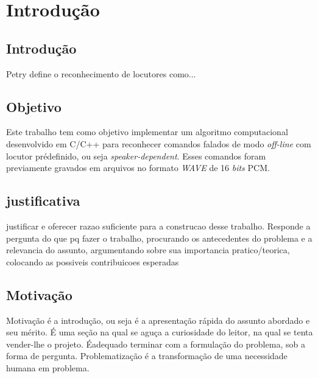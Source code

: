 \documentclass[a4paper,12pt,twoside,openright]{report}
\begin{document}
\chapter{Introdu\c{c}\~{a}o}
\thispagestyle{myheadings}
\pagestyle{myheadings}
\section{Introdu\c{c}\~{a}o}
\label{cap1}
\par Petry \cite{PETRY2002} define o reconhecimento de locutores como...
\section{Objetivo}
\par Este trabalho tem como objetivo implementar um algoritmo computacional desenvolvido em C/C++ para reconhecer comandos falados de modo \textit{off-line} com locutor pr\'{e}definido, ou seja \textit{speaker-dependent}. Esses comandos foram previamente gravados em arquivos no formato \textit{WAVE} de 16 \textit{bits} PCM.

\section{justificativa}
\par justificar e oferecer razao suficiente para a construcao desse trabalho. Responde a pergunta do que pq fazer o trabalho, procurando os antecedentes do problema e a relevancia do assunto, argumentando sobre sua importancia pratico/teorica, colocando as possiveis contribuicoes esperadas

\section{Motiva\c{c}\~{a}o}
\par Motivação é a introdução, ou seja é a apresentação rápida do assunto abordado e seu mérito. É uma seção na qual se aguça a curiosidade do leitor, na qual se tenta vender-lhe o projeto. Éadequado terminar com a formulação do problema, sob a forma de pergunta.
Problematização é a transformação de uma necessidade humana em problema.
\end{document}

